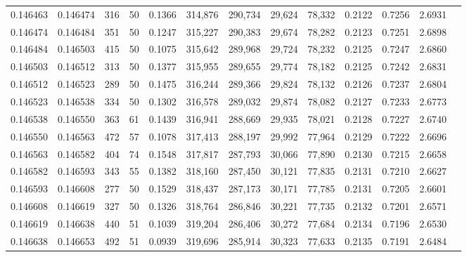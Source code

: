\begin{tabular}{rrrrrrrrrrrrr}
0.146463 & 0.146474 &   316 &  50 &                                     0.1366 & 314,876 & 290,734 &  29,624 &  78,332 & 0.2122 & 0.7256 & 2.6931 \\
0.146474 & 0.146484 &   351 &  50 &                                     0.1247 & 315,227 & 290,383 &  29,674 &  78,282 & 0.2123 & 0.7251 & 2.6898 \\
0.146484 & 0.146503 &   415 &  50 &                                     0.1075 & 315,642 & 289,968 &  29,724 &  78,232 & 0.2125 & 0.7247 & 2.6860 \\
0.146503 & 0.146512 &   313 &  50 &                                     0.1377 & 315,955 & 289,655 &  29,774 &  78,182 & 0.2125 & 0.7242 & 2.6831 \\
0.146512 & 0.146523 &   289 &  50 &                                     0.1475 & 316,244 & 289,366 &  29,824 &  78,132 & 0.2126 & 0.7237 & 2.6804 \\
0.146523 & 0.146538 &   334 &  50 &                                     0.1302 & 316,578 & 289,032 &  29,874 &  78,082 & 0.2127 & 0.7233 & 2.6773 \\
0.146538 & 0.146550 &   363 &  61 &                                     0.1439 & 316,941 & 288,669 &  29,935 &  78,021 & 0.2128 & 0.7227 & 2.6740 \\
0.146550 & 0.146563 &   472 &  57 &                                     0.1078 & 317,413 & 288,197 &  29,992 &  77,964 & 0.2129 & 0.7222 & 2.6696 \\
0.146563 & 0.146582 &   404 &  74 &                                     0.1548 & 317,817 & 287,793 &  30,066 &  77,890 & 0.2130 & 0.7215 & 2.6658 \\
0.146582 & 0.146593 &   343 &  55 &                                     0.1382 & 318,160 & 287,450 &  30,121 &  77,835 & 0.2131 & 0.7210 & 2.6627 \\
0.146593 & 0.146608 &   277 &  50 &                                     0.1529 & 318,437 & 287,173 &  30,171 &  77,785 & 0.2131 & 0.7205 & 2.6601 \\
0.146608 & 0.146619 &   327 &  50 &                                     0.1326 & 318,764 & 286,846 &  30,221 &  77,735 & 0.2132 & 0.7201 & 2.6571 \\
0.146619 & 0.146638 &   440 &  51 &                                     0.1039 & 319,204 & 286,406 &  30,272 &  77,684 & 0.2134 & 0.7196 & 2.6530 \\
0.146638 & 0.146653 &   492 &  51 &                                     0.0939 & 319,696 & 285,914 &  30,323 &  77,633 & 0.2135 & 0.7191 & 2.6484 \\

\end{tabular}

